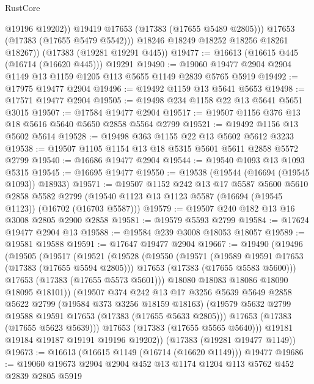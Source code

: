 \begin{lexlean}{RustCore}
\begin{coremodule}
                @19196
                @19202))
            @19419
            @17653
            (@17383 (@17655 @5489 @2805)))
          @17653
          (@17383 (@17655 @5479 @5542)))
        @18246
        @18249
        @18252
        @18256
        @18261
        @18267))
    (@17383 (@19281 @19291 @445))
@19477 := @16613 (@16615 @445 (@16714 (@16620 @445))) @19291
@19490 := @19060 @19477 @2904 @2904 @1149 @13 @1159 @1205 @113 @5655 @1149 @2839 @5765 @5919
@19492 := @17975 @19477 @2904
@19496 := @19492 @1159 @13 @5641 @5653
@19498 := @17571 @19477 @2904
@19505 := @19498 @234 @1158 @22 @13 @5641 @5651 @3015
@19507 := @17584 @19477 @2904
@19517 := @19507 @1156 @376 @13 @18 @5616 @5640 @5650 @2858 @5564 @2799
@19521 := @19492 @1156 @13 @5602 @5614
@19528 := @19498 @363 @1155 @22 @13 @5602 @5612 @3233
@19538 := @19507 @1105 @1154 @13 @18 @5315 @5601 @5611 @2858 @5572 @2799
@19540 := @16686 @19477 @2904
@19544 := @19540 @1093 @13 @1093 @5315
@19545 := @16695 @19477
@19550 := @19538 (@19544 (@16694 (@19545 @1093)) @18933)
@19571 := @19507
    @1152
    @242
    @13
    @17
    @5587
    @5600
    @5610
    @2858
    @5582
    @2799
    (@19540 @1123 @13 @1123 @5587 (@16694 (@19545 @1123)) (@16702 (@16703 @5587)))
@19579 := @19507 @240 @182 @13 @16 @3008 @2805 @2900 @2858
@19581 := @19579 @5593 @2799
@19584 := @17624 @19477 @2904 @13
@19588 := @19584 @239 @3008 @18053 @18057
@19589 := @19581 @19588
@19591 := @17647 @19477 @2904
@19667 := @19490
    (@19496
      (@19505
        (@19517
          (@19521
            (@19528
              (@19550
                (@19571
                  (@19589 @19591 @17653 (@17383 (@17655 @5594 @2805)))
                  @17653
                  (@17383 (@17655 @5583 @5600)))
                @17653
                (@17383 (@17655 @5573 @5601)))
              @18080
              @18083
              @18086
              @18090
              @18095
              @18101))
          (@19507
            @374
            @242
            @13
            @17
            @3256
            @5639
            @5649
            @2858
            @5622
            @2799
            (@19584 @373 @3256 @18159 @18163)
            (@19579 @5632 @2799 @19588 @19591 @17653 (@17383 (@17655 @5633 @2805)))
            @17653
            (@17383 (@17655 @5623 @5639)))
          @17653
          (@17383 (@17655 @5565 @5640)))
        @19181
        @19184
        @19187
        @19191
        @19196
        @19202))
    (@17383 (@19281 @19477 @1149))
@19673 := @16613 (@16615 @1149 (@16714 (@16620 @1149))) @19477
@19686 := @19060 @19673 @2904 @2904 @452 @13 @1174 @1204 @113 @5762 @452 @2839 @2805 @5919

\end{coremodule}
\end{lexlean}
